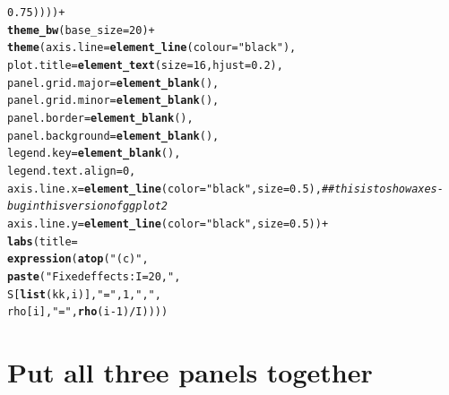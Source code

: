 \documentclass{article}\usepackage[]{graphicx}\usepackage[]{color}
\makeatletter
\newcommand{\hlnum}[1]{\textcolor[rgb]{0.686,0.059,0.569}{#1}}%
\newcommand{\hlstr}[1]{\textcolor[rgb]{0.192,0.494,0.8}{#1}}%
\newcommand{\hlcom}[1]{\textcolor[rgb]{0.678,0.584,0.686}{\textit{#1}}}%
\newcommand{\hlopt}[1]{\textcolor[rgb]{0,0,0}{#1}}%
\newcommand{\hlstd}[1]{\textcolor[rgb]{0.345,0.345,0.345}{#1}}%
\newcommand{\hlkwc}[1]{\textcolor[rgb]{0.333,0.667,0.333}{#1}}%
\newcommand{\hlkwd}[1]{\textcolor[rgb]{0.737,0.353,0.396}{\textbf{#1}}}%
\newenvironment{kframe}{%
 \def\at@end@of@kframe{}%
 \ifinner\ifhmode%
  \def\at@end@of@kframe{\end{minipage}}%
  \begin{minipage}{\columnwidth}%
 \fi\fi%
 \def\FrameCommand##1{\hskip\@totalleftmargin \hskip-\fboxsep
 \colorbox{shadecolor}{##1}\hskip-\fboxsep
     \hskip-\linewidth \hskip-\@totalleftmargin \hskip\columnwidth}%
 \MakeFramed {\advance\hsize-\width
   \@totalleftmargin\z@ \linewidth\hsize
   \@setminipage}}%
 {\par\unskip\endMakeFramed%
 \at@end@of@kframe}
\newenvironment{knitrout}{}{} %
\makeatother
\begin{document}
\begin{knitrout}
\begin{kframe}
\begin{alltt}
                                            \hlnum{0.75}\hlstd{))))} \hlopt{+}
  \hlkwd{theme_bw}\hlstd{(}\hlkwc{base_size} \hlstd{=} \hlnum{20}\hlstd{)} \hlopt{+}
  \hlkwd{theme}\hlstd{(}\hlkwc{axis.line} \hlstd{=} \hlkwd{element_line}\hlstd{(}\hlkwc{colour} \hlstd{=} \hlstr{"black"}\hlstd{),}
        \hlkwc{plot.title} \hlstd{=} \hlkwd{element_text}\hlstd{(}\hlkwc{size} \hlstd{=} \hlnum{16}\hlstd{,} \hlkwc{hjust} \hlstd{=} \hlnum{0.2}\hlstd{),}
        \hlkwc{panel.grid.major} \hlstd{=} \hlkwd{element_blank}\hlstd{(),}
        \hlkwc{panel.grid.minor} \hlstd{=} \hlkwd{element_blank}\hlstd{(),}
        \hlkwc{panel.border} \hlstd{=} \hlkwd{element_blank}\hlstd{(),}
        \hlkwc{panel.background} \hlstd{=} \hlkwd{element_blank}\hlstd{(),}
        \hlkwc{legend.key} \hlstd{=} \hlkwd{element_blank}\hlstd{(),}
        \hlkwc{legend.text.align} \hlstd{=} \hlnum{0}\hlstd{,}
        \hlkwc{axis.line.x} \hlstd{=} \hlkwd{element_line}\hlstd{(}\hlkwc{color}\hlstd{=}\hlstr{"black"}\hlstd{,} \hlkwc{size} \hlstd{=} \hlnum{0.5}\hlstd{),} \hlcom{##this is to show axes - bug in this version of ggplot2}
        \hlkwc{axis.line.y} \hlstd{=} \hlkwd{element_line}\hlstd{(}\hlkwc{color}\hlstd{=}\hlstr{"black"}\hlstd{,} \hlkwc{size} \hlstd{=} \hlnum{0.5}\hlstd{))} \hlopt{+}
  \hlkwd{labs}\hlstd{(}\hlkwc{title}\hlstd{=}
         \hlkwd{expression}\hlstd{(}\hlkwd{atop}\hlstd{(}\hlstr{"(c)"}\hlstd{,}
                         \hlkwd{paste}\hlstd{(}\hlstr{"Fixed effects: I = 20, "}\hlstd{,}
                               \hlstd{S[}\hlkwd{list}\hlstd{(kk,i)],} \hlstr{" = "}\hlstd{,} \hlnum{1}\hlstd{,} \hlstr{", "}\hlstd{,}
                               \hlstd{rho[i],} \hlstr{" = "}\hlstd{,} \hlkwd{rho}\hlstd{(i}\hlopt{-}\hlnum{1}\hlstd{)}\hlopt{/}\hlstd{I))))}
\end{alltt}
\end{kframe}
\end{knitrout}

\section{Put all three panels together}
\end{document}
